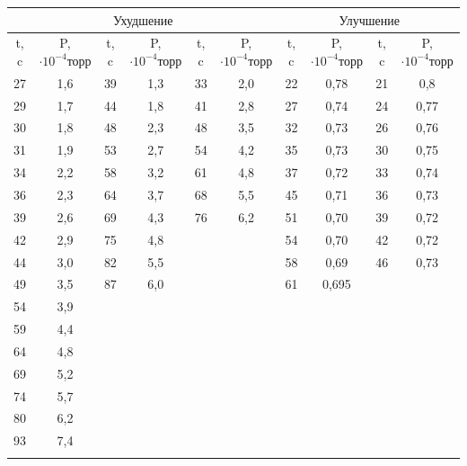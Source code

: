 \documentclass[a4paper,12pt]{article} %
\begin{document}
\begin{center}
\begin{tabular}{|c|c|c|c|c|c|c|c|c|c|}
\hline 
\multicolumn{6}{|c|}{$\text{Ухудшение}$} & \multicolumn{4}{c|}{$\text{Улучшение}$} \\ 
\hline 
t, c & P, $\cdot 10^{-4} \text{торр}$ & t, c & P, $\cdot 10^{-4} \text{торр}$ & t, c & P, $\cdot 10^{-4} \text{торр}$ & t, c & P, $\cdot 10^{-4} \text{торр}$ & t, c & P, $\cdot 10^{-4} \text{торр}$ \\ 
\hline
27 & 1,6	 & 39 & 1,3 & 33 & 2,0 & 22 & 0,78 & 21 & 0,8\\
\hline
29 & 1,7	 & 44 & 1,8 & 41 & 2,8 & 27 & 0,74 & 24 & 0,77\\
\hline
30 & 1,8	 & 48 & 2,3 & 48 & 3,5 & 32 & 0,73 & 26 & 0,76\\
\hline
31 & 1,9	 & 53 & 2,7 & 54 & 4,2 & 35 & 0,73 & 30 & 0,75\\
\hline
34 & 2,2	 & 58 & 3,2 & 61 & 4,8 & 37 & 0,72 & 33 & 0,74\\
\hline
36 & 2,3	 & 64 & 3,7 & 68 & 5,5 & 45 & 0,71 & 36 & 0,73\\
\hline
39 & 2,6	 & 69 & 4,3 & 76 & 6,2 & 51 & 0,70 & 39 & 0,72\\
\hhline{----------}
42 & 2,9	 & 75 & 4,8 & \multicolumn{2}{|c|}{ } & 54 & 0,70 & 42 & 0,72\\
\hhline{----~~----}
44 & 3,0	 & 82 & 5,5 &  \multicolumn{2}{|c|}{ }  & 58 & 0,69 & 46 & 0,73\\
\hhline{----~~----}
49 & 3,5	 & 87 & 6,0 &  \multicolumn{2}{|c|}{ }  & 61 & 0,695 &  \multicolumn{2}{|c}{ } \\
\hhline{----~~--~~}
54 & 3,9	 &  \multicolumn{8}{|c}{ } \\
\hhline{--~~~~~~~~}
59 & 4,4	 &  \multicolumn{8}{|c}{ } \\
\hhline{--~~~~~~~~}
64 & 4,8	 &  \multicolumn{8}{|c}{ } \\
\hhline{--~~~~~~~~}
69 & 5,2	 &  \multicolumn{8}{|c}{ } \\
\hhline{--~~~~~~~~}
74 & 5,7	 &  \multicolumn{8}{|c}{ } \\
\hhline{--~~~~~~~~}
80 & 6,2	 &  \multicolumn{8}{|c}{ } \\
\hhline{--~~~~~~~~}
93 & 7,4	 &  \multicolumn{8}{|c}{ } \\
\hhline{--~~~~~~~~} 
\end{tabular} 
\end{center}

\medskip
\end{document}
